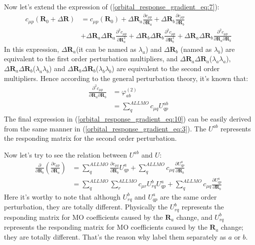 Now let's extend the expression of (\ref{orbital_response_gradient_eq:7}):
\begin{align}
    \label{orbital_response_gradient_eq:9}
c_{\mu p}(\bm{R}_{0} + \Delta \bm{R}) &=  c_{\mu p}(\bm{R}_{0}) + \Delta
\bm{R}_{a}\frac{\partial c_{\mu p}}{\partial \bm{R}_{a}} + \Delta
\bm{R}_{b}\frac{\partial c_{\mu p}}{\partial \bm{R}_{b}} \nonumber \\
& + \Delta\bm{R}_{a}\Delta\bm{R}_{a}\frac{\partial^{2} c_{\mu p}}{\partial
\bm{R}_{a}^{2}} +  \Delta\bm{R}_{b}\Delta\bm{R}_{b}\frac{\partial^{2} c_{\mu
p}}{\partial \bm{R}_{b}^{2}} +
\Delta\bm{R}_{a}\Delta\bm{R}_{b}\frac{\partial^{2} c_{\mu
p}}{\partial\bm{R}_{a}\partial\bm{R}_{b}}
\end{align}
In this expression, $\Delta\bm{R}_{a}$(it can be named as $\lambda_{a}$) and
$\Delta\bm{R}_{b}$ (named as $\lambda_{b}$) are equivalent to the first order
perturbation multipliers, and
$\Delta\bm{R}_{a}\Delta\bm{R}_{a}$($\lambda_{a}\lambda_{a}$),
$\Delta\bm{R}_{a}\Delta\bm{R}_{b}$($\lambda_{a}\lambda_{b}$) and
$\Delta\bm{R}_{b}\Delta\bm{R}_{b}$($\lambda_{b}\lambda_{b}$) are equivalent to
the second order multipliers. Hence according to the general perturbation
theory, it's known that:
\begin{align}
    \label{orbital_response_gradient_eq:10}
\frac{\partial^{2} c_{\mu
p}}{\partial\bm{R}_{a}\partial\bm{R}_{b}} &= \varphi^{(2)}_{ab} \nonumber \\
&= \sum_{q}^{ALL MO}c_{\mu q}U^{ab}_{qp}
\end{align}
The final expression in (\ref{orbital_response_gradient_eq:10}) can be easily
derived from the same manner in (\ref{orbital_response_gradient_eq:3}). The
$U^{ab}$ represents the responding matrix for the second order perturbation. 

Now let's try to see the relation between $U^{ab}$ and $U$:
\begin{equation}
 \begin{split}
  \frac{\partial}{\partial\bm{R}_{b}} \left( \frac{\partial c_{\mu
p}}{\partial\bm{R}_{a}}\right)  &= \sum_{q}^{ALL MO}\frac{\partial c_{\mu
q}}{\partial\bm{R}_{b}}U^{a}_{qp} + \sum_{q}^{ALL MO}c_{\mu q}\frac{\partial
U^{a}_{qp}}{\partial\bm{R}_{b}}  \\
&= \sum_{q}^{ALL MO}\sum_{r}^{ALL MO}c_{\mu r}U^{b}_{rq}U^{a}_{qp} +
\sum_{q}^{ALL
MO}c_{\mu q}\frac{\partial U^{a}_{qp}}{\partial\bm{R}_{b}}
 \end{split}
\label{orbital_response_gradient_eq:11}
\end{equation}
Here it's worthy to note that although $U^{b}_{rq}$ and $U^{a}_{qp}$ are
the same order perturbation, they are totally different. Physically the
$U^{b}_{rq}$ represents the responding matrix for MO coefficients caused by the
$\bm{R}_{a}$ change, and $U^{b}_{rq}$ represents the responding matrix for
MO coefficients caused by the $\bm{R}_{a}$ change; they are totally different.
That's the reason why label them separately as $a$ or $b$. 

